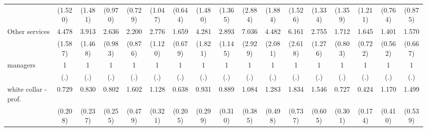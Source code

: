 {\begin{tabular}{l*{16}{c}}
                    &     (1.520)         &     (1.481)         &     (0.970)         &     (0.729)         &     (1.047)         &     (0.644)         &     (1.480)         &     (1.365)         &     (2.884)         &     (1.884)         &     (1.526)         &     (1.334)         &     (1.359)         &     (1.211)         &     (0.764)         &     (0.875)         \\
[1em]
Other services      &       4.478\sym{***}&       3.913\sym{***}&       2.636\sym{**} &       2.200\sym{*}  &       2.776\sym{*}  &       1.659         &       4.281\sym{***}&       2.893\sym{**} &       7.036\sym{***}&       4.482\sym{**} &       6.161\sym{***}&       2.755\sym{*}  &       1.712         &       1.645         &       1.401         &       1.570         \\
                    &     (1.587)         &     (1.468)         &     (0.983)         &     (0.876)         &     (1.120)         &     (0.679)         &     (1.821)         &     (1.145)         &     (2.929)         &     (2.081)         &     (2.618)         &     (1.276)         &     (0.803)         &     (0.722)         &     (0.562)         &     (0.667)         \\
[1em]
managers            &           1         &           1         &           1         &           1         &           1         &           1         &           1         &           1         &           1         &           1         &           1         &           1         &           1         &           1         &           1         &           1         \\
                    &         (.)         &         (.)         &         (.)         &         (.)         &         (.)         &         (.)         &         (.)         &         (.)         &         (.)         &         (.)         &         (.)         &         (.)         &         (.)         &         (.)         &         (.)         &         (.)         \\
[1em]
white collar - prof.&       0.729         &       0.830         &       0.802         &       1.602         &       1.128         &       0.638         &       0.931         &       0.889         &       1.084         &       1.283         &       1.834         &       1.546         &       0.727         &       0.424\sym{*}  &       1.170         &       1.499         \\
                    &     (0.208)         &     (0.237)         &     (0.255)         &     (0.479)         &     (0.321)         &     (0.205)         &     (0.299)         &     (0.310)         &     (0.385)         &     (0.498)         &     (0.737)         &     (0.605)         &     (0.301)         &     (0.174)         &     (0.410)         &     (0.539)         \\

\end{tabular}}
